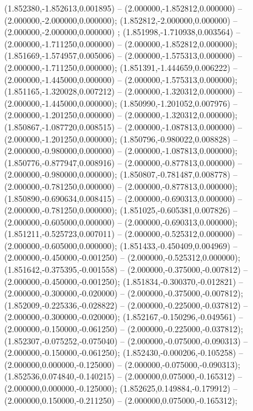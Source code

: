  (1.852380,-1.852613,0.001895) -- (2.000000,-1.852812,0.000000) -- (2.000000,-2.000000,0.000000);
 (1.852812,-2.000000,0.000000) -- (2.000000,-2.000000,0.000000) ;
 (1.851998,-1.710938,0.003564) -- (2.000000,-1.711250,0.000000) -- (2.000000,-1.852812,0.000000);
 (1.851669,-1.574957,0.005006) -- (2.000000,-1.575313,0.000000) -- (2.000000,-1.711250,0.000000);
 (1.851391,-1.444659,0.006222) -- (2.000000,-1.445000,0.000000) -- (2.000000,-1.575313,0.000000);
 (1.851165,-1.320028,0.007212) -- (2.000000,-1.320312,0.000000) -- (2.000000,-1.445000,0.000000);
 (1.850990,-1.201052,0.007976) -- (2.000000,-1.201250,0.000000) -- (2.000000,-1.320312,0.000000);
 (1.850867,-1.087720,0.008515) -- (2.000000,-1.087813,0.000000) -- (2.000000,-1.201250,0.000000);
 (1.850796,-0.980022,0.008828) -- (2.000000,-0.980000,0.000000) -- (2.000000,-1.087813,0.000000);
 (1.850776,-0.877947,0.008916) -- (2.000000,-0.877813,0.000000) -- (2.000000,-0.980000,0.000000);
 (1.850807,-0.781487,0.008778) -- (2.000000,-0.781250,0.000000) -- (2.000000,-0.877813,0.000000);
 (1.850890,-0.690634,0.008415) -- (2.000000,-0.690313,0.000000) -- (2.000000,-0.781250,0.000000);
 (1.851025,-0.605381,0.007826) -- (2.000000,-0.605000,0.000000) -- (2.000000,-0.690313,0.000000);
 (1.851211,-0.525723,0.007011) -- (2.000000,-0.525312,0.000000) -- (2.000000,-0.605000,0.000000);
 (1.851433,-0.450409,0.004969) -- (2.000000,-0.450000,-0.001250) -- (2.000000,-0.525312,0.000000);
 (1.851642,-0.375395,-0.001558) -- (2.000000,-0.375000,-0.007812) -- (2.000000,-0.450000,-0.001250);
 (1.851834,-0.300370,-0.012821) -- (2.000000,-0.300000,-0.020000) -- (2.000000,-0.375000,-0.007812);
 (1.852009,-0.225336,-0.028822) -- (2.000000,-0.225000,-0.037812) -- (2.000000,-0.300000,-0.020000);
 (1.852167,-0.150296,-0.049561) -- (2.000000,-0.150000,-0.061250) -- (2.000000,-0.225000,-0.037812);
 (1.852307,-0.075252,-0.075040) -- (2.000000,-0.075000,-0.090313) -- (2.000000,-0.150000,-0.061250);
 (1.852430,-0.000206,-0.105258) -- (2.000000,0.000000,-0.125000) -- (2.000000,-0.075000,-0.090313);
 (1.852536,0.074840,-0.140215) -- (2.000000,0.075000,-0.165312) -- (2.000000,0.000000,-0.125000);
 (1.852625,0.149884,-0.179912) -- (2.000000,0.150000,-0.211250) -- (2.000000,0.075000,-0.165312);
